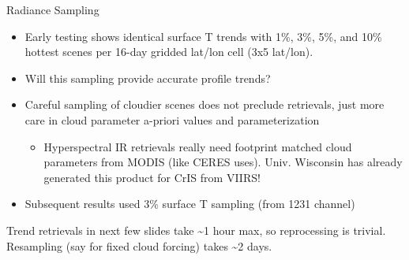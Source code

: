 \documentclass[10pt,t]{beamer}
\begin{document}
\begin{frame}{Radiance Sampling}
\begin{itemize}
\item Early testing shows identical surface T trends with 1\%, 3\%, 5\%, and 10\% hottest scenes per 16-day gridded lat/lon cell (3x5 lat/lon).
\item Will this sampling provide accurate profile trends?
\item Careful sampling of cloudier scenes does not preclude retrievals, just more care in cloud parameter a-priori values and parameterization
\begin{itemize}
\item Hyperspectral IR retrievals really need footprint matched cloud parameters from MODIS (like CERES uses).  Univ. Wisconsin has already generated this product for CrIS from VIIRS!
\end{itemize}
\item Subsequent results used 3\% surface T sampling (from 1231 \wn channel)

\vspace{0.1in}
\end{itemize}

Trend retrievals in next few slides take \textasciitilde{}1 hour max, so reprocessing is trivial.\\
  \vspace{0.1in}
Resampling (say for fixed cloud forcing) takes \textasciitilde{}2 days.  
\end{frame}
\end{document}
